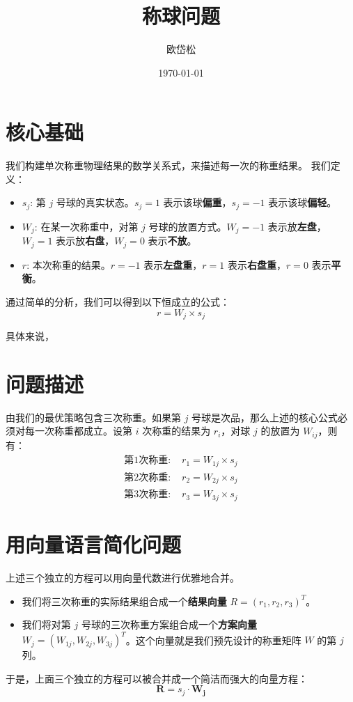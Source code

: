 \documentclass[12pt, a4paper]{ctexart}
\title{称球问题}
\author{欧岱松}
\date{\today}
\begin{document}
\maketitle

\section{核心基础}

我们构建单次称重物理结果的数学关系式，来描述每一次的称重结果。
我们定义：
\begin{itemize}
    \item $s_j$: 第 $j$ 号球的真实状态。$s_j=1$ 表示该球\textbf{偏重}，$s_j=-1$ 表示该球\textbf{偏轻}。
    \item $W_j$: 在某一次称重中，对第 $j$ 号球的放置方式。$W_j=-1$ 表示放\textbf{左盘}，$W_j=1$ 表示放\textbf{右盘}，$W_j=0$ 表示\textbf{不放}。
    \item $r$: 本次称重的结果。$r=-1$ 表示\textbf{左盘重}，$r=1$ 表示\textbf{右盘重}，$r=0$ 表示\textbf{平衡}。
\end{itemize}
通过简单的分析，我们可以得到以下恒成立的公式：
\begin{equation}
    r = W_j \times s_j
\end{equation}

具体来说，

\section{问题描述}

由我们的最优策略包含三次称重。如果第 $j$ 号球是次品，那么上述的核心公式必须对每一次称重都成立。设第 $i$ 次称重的结果为 $r_i$，对球 $j$ 的放置为 $W_{ij}$，则有：
\begin{align*}
    \text{第1次称重: } & r_1 = W_{1j} \times s_j \\
    \text{第2次称重: } & r_2 = W_{2j} \times s_j \\
    \text{第3次称重: } & r_3 = W_{3j} \times s_j
\end{align*}

\section{用向量语言简化问题}

上述三个独立的方程可以用向量代数进行优雅地合并。
\begin{itemize}
    \item 我们将三次称重的实际结果组合成一个\textbf{结果向量} $R = (r_1, r_2, r_3)^T$。
    \item 我们将对第 $j$ 号球的三次称重方案组合成一个\textbf{方案向量} $W_j = (W_{1j}, W_{2j}, W_{3j})^T$。这个向量就是我们预先设计的称重矩阵 $W$ 的第 $j$ 列。
\end{itemize}
于是，上面三个独立的方程可以被合并成一个简洁而强大的向量方程：
\begin{equation}
    \mathbf{R} = s_j \cdot \mathbf{W_j}
\end{equation}
\end{document}

